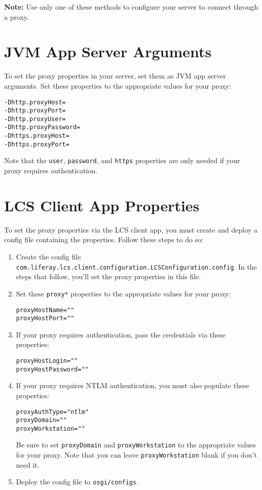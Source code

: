 \textbf{Note:} Use only one of these methods to configure your server to
connect through a proxy.

\noindent\hrulefill

\section{JVM App Server Arguments}\label{jvm-app-server-arguments}

To set the proxy properties in your server, set them as JVM app server
arguments. Set these properties to the appropriate values for your
proxy:

\begin{verbatim}
-Dhttp.proxyHost=
-Dhttp.proxyPort=
-Dhttp.proxyUser=
-Dhttp.proxyPassword=
-Dhttps.proxyHost=
-Dhttps.proxyPort=
\end{verbatim}

Note that the \texttt{user}, \texttt{password}, and \texttt{https}
properties are only needed if your proxy requires authentication.

\section{LCS Client App Properties}\label{lcs-client-app-properties}

To set the proxy properties via the LCS client app, you must create and
deploy a config file containing the properties. Follow these steps to do
so:

\begin{enumerate}
\def\labelenumi{\arabic{enumi}.}
\item
  Create the config file
  \texttt{com.liferay.lcs.client.configuration.LCSConfiguration.config}.
  In the steps that follow, you'll set the proxy properties in this
  file.
\item
  Set these \texttt{proxy*} properties to the appropriate values for
  your proxy:

\begin{verbatim}
proxyHostName=""
proxyHostPort=""
\end{verbatim}
\item
  If your proxy requires authentication, pass the credentials via these
  properties:

\begin{verbatim}
proxyHostLogin=""
proxyHostPassword=""
\end{verbatim}
\item
  If your proxy requires NTLM authentication, you must also populate
  these properties:

\begin{verbatim}
proxyAuthType="ntlm"
proxyDomain=""
proxyWorkstation=""
\end{verbatim}

  Be sure to set \texttt{proxyDomain} and \texttt{proxyWorkstation} to
  the appropriate values for your proxy. Note that you can leave
  \texttt{proxyWorkstation} blank if you don't need it.
\item
  Deploy the config file to \texttt{osgi/configs}.
\end{enumerate}

